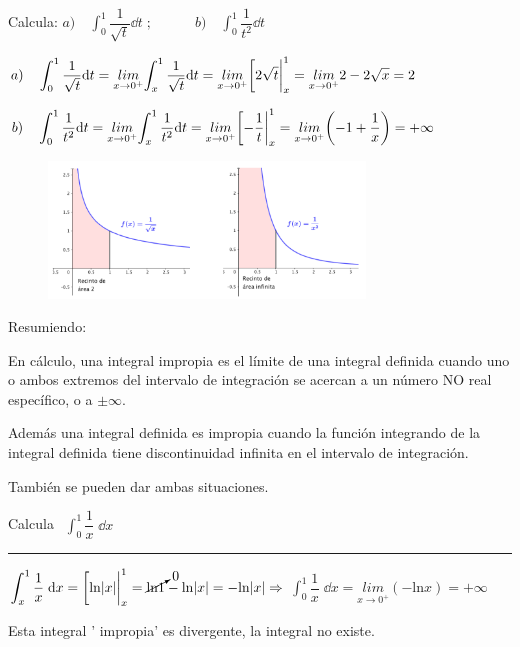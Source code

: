 \vspace{4mm} \begin{miejercicio}

Calcula: $a) \quad \displaystyle \int_0^1 \dfrac {1}{\sqrt{t}} \dd t\; ; \qquad \quad b) \quad \displaystyle \int_0^1 \dfrac {1} {t^2} \dd t $	

$a) \quad \displaystyle \int_0^1 \dfrac {1}{\sqrt{t}} \dd t= \underset {x\to 0^+}{lim}{\int_x^1 \dfrac {1}{\sqrt{t}} \dd t} =\underset {x\to 0^+}{lim} { \eval[2\sqrt{t}|_x^1 }= \underset {x\to 0^+}{lim} {2-2\sqrt{x}}=2$

$b) \quad  \displaystyle \int_0^1 \dfrac {1} {t^2} \dd t = \underset {x\to 0^+}{lim}{\int_x^1 \dfrac {1}{t^2} \dd t}= \underset {x\to 0^+}{lim} { \eval[-\dfrac 1 t|_x^1 }=\underset {x\to 0^+}{lim} {\left(-1+\dfrac 1 x  \right)}=+\infty$

\begin{figure}[H]
 	\centering
	\includegraphics[width=0.75\textwidth]{imagenes/IMPROPIAS/T08IM11.png}
\end{figure}

\end{miejercicio}

\vspace{4mm} Resumiendo:

En cálculo, una integral impropia es el límite de una integral definida cuando uno o ambos extremos del intervalo de integración se acercan a un número NO real específico,  o a $\pm \infty$.

Además una integral definida es impropia cuando la función integrando de la integral definida tiene discontinuidad infinita en el intervalo de integración. 

También se pueden dar ambas situaciones.


\vspace{1cm}


\begin{miejercicio}


	Calcula $\ \ \displaystyle \int_0^1 \dfrac 1 x \; \dd x$
\vspace{3mm}

\rule{200pt}{0.1pt}

\vspace{2mm}	
	
	$\displaystyle \int_x^1 \dfrac 1 x \; \dd x= \eval[\mathrm{ln}\abs {x}|_x^1=  \cancelto{0}{\mathrm{ln} 1}- \mathrm{ln} |x|=-\mathrm{ln} |x| \Rightarrow $
	$\displaystyle \int_0^1 \dfrac 1 x \; \dd x= \underset {x\to 0^+}{lim }{(-\mathrm{ln} x)} =+\infty $
	
	Esta integral ' impropia' es divergente, la integral no existe.
	
\end{miejercicio}

